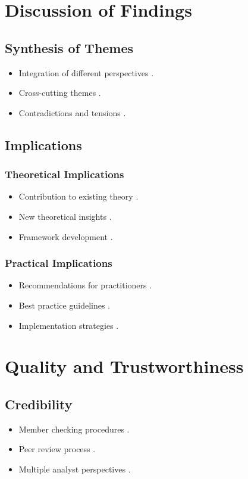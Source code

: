 \documentclass[a4paper]{report}
\begin{document}
\section{Discussion of Findings}  
\subsection{Synthesis of Themes}  
\begin{itemize}  
    \item Integration of different perspectives \cite{williams2024}.  
    \item Cross-cutting themes \cite{davis2024}.  
    \item Contradictions and tensions \cite{anderson2023}.  
\end{itemize}  

\subsection{Implications}  
\subsubsection{Theoretical Implications}  
\begin{itemize}  
    \item Contribution to existing theory \cite{martin2023}.  
    \item New theoretical insights \cite{morris2024}.  
    \item Framework development \cite{jones2024}.  
\end{itemize}  

\subsubsection{Practical Implications}  
\begin{itemize}  
    \item Recommendations for practitioners \cite{harrison2024}.  
    \item Best practice guidelines \cite{smith2023}.  
    \item Implementation strategies \cite{davis2023}.  
\end{itemize}  

\section{Quality and Trustworthiness}  
\subsection{Credibility}  
\begin{itemize}  
    \item Member checking procedures \cite{foster2024}.  
    \item Peer review process \cite{roberts2023}.  
    \item Multiple analyst perspectives \cite{brown2024}.  
\end{itemize}  
\end{document}
